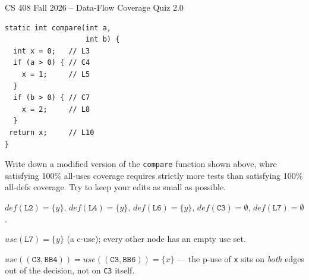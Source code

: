 \documentclass[addpoints]{exam}
\begin{document}
\thispagestyle{empty}

\begin{center}
	{\LARGE CS 408 Fall 2026 -- Data-Flow Coverage Quiz 2.0 \\}
\end{center}

\vspace{5mm}

\vspace{10mm}


\begin{questions}

\begin{verbatim}
static int compare(int a,
                   int b) {
  int x = 0;   // L3
  if (a > 0) { // C4
    x = 1;     // L5
  }
  if (b > 0) { // C7
    x = 2;     // L8
  }
 return x;     // L10
}
\end{verbatim}

\question Write down a modified version of the
  \texttt{compare} function shown above, whre satisfying
  100\% all-uses coverage requires strictly more tests than satisfying
  100\% all-defs coverage. Try to keep your edits as small as
  possible.

    \begin{solution} %
      $def(\texttt{L2}) = \{y\}$, \;
      $def(\texttt{L4}) = \{y\}$, \;
      $def(\texttt{L6}) = \{y\}$, \;
      $def(\texttt{C3}) = \emptyset$, \;
      $def(\texttt{L7}) = \emptyset$.

      $use(\texttt{L7}) = \{y\}$ (a c-use); every other node has an
      empty use set.

      $use((\texttt{C3},\texttt{BB4})) =
       use((\texttt{C3},\texttt{BB6})) = \{x\}$ --- the p-use of
      \texttt{x} sits on \emph{both} edges out of the
      decision, not on \texttt{C3} itself.
    \end{solution}

\end{questions}
\end{document}
